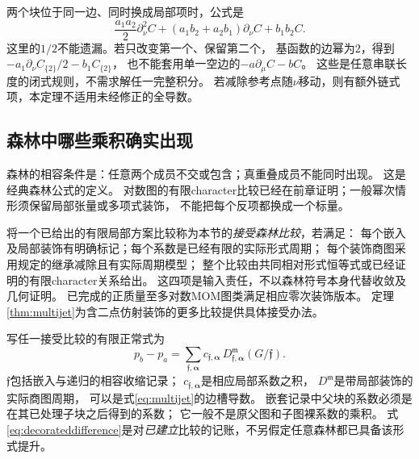 \documentclass[11pt,a4paper]{ctexart}
\theoremstyle{cnplain}\newtheorem{theorem}{定理}[section]
\theoremstyle{definition}\newtheorem{definition}[theorem]{定义}
\theoremstyle{remark}\newtheorem{remark}[theorem]{注}
\begin{document}
两个块位于同一边、同时换成局部项时，公式是
\begin{equation}\label{eq:twojets}
 \frac{a_1a_2}{2}\partial_\nu^2 C
 +(a_1b_2+a_2b_1)\partial_\nu C+b_1b_2 C.
\end{equation}
这里的$1/2$不能遗漏。若只改变第一个、保留第二个，
基函数的边幂为$2$，得到$-a_1\partial_\nu C_{\{2\}}/2-b_1C_{\{2\}}$，
也不能套用单一空边的$-a\partial_\mu C-bC$。
这些是任意串联长度的闭式规则，不需求解任一完整积分。
若减除参考点随$\nu$移动，则有额外链式项，本定理不适用未经修正的全导数。

\subsection{森林中哪些乘积确实出现}

森林的相容条件是：任意两个成员不交或包含；真重叠成员不能同时出现。
这是经典森林公式的定义\cite[\S2--3.2]{BK}。
对数图的有限character比较已经在前章证明；一般幂次情形须保留局部张量或多项式装饰，
不能把每个反项都换成一个标量。

将一个已给出的有限局部方案比较称为本节的\emph{接受森林比较}，若满足：
每个嵌入及局部装饰有明确标记；每个系数是已经有限的实际形式周期；
每个装饰商图采用规定的继承减除且有实际周期模型；
整个比较由共同相对形式恒等式或已经证明的有限character关系给出。
这四项是输入责任，不以森林符号本身代替收敛及几何证明。
已完成的正质量至多对数MOM图类满足相应零次装饰版本。
定理\ref{thm:multijet}为含二点仿射装饰的更多比较提供具体接受办法。

写任一接受比较的有限正常式为
\begin{equation}\label{eq:decorateddifference}
 p_b-p_a=
 \sum_{\mathfrak f,\boldsymbol\alpha}
 c_{\mathfrak f,\boldsymbol\alpha}\,
 D_{\mathfrak f,\boldsymbol\alpha}^{\mathfrak m}
 (G/\mathfrak f).
\end{equation}
$\mathfrak f$包括嵌入与递归的相容收缩记录；
$c_{\mathfrak f,\boldsymbol\alpha}$是相应局部系数之积，
$D^{\mathfrak m}$是带局部装饰的实际商图周期，
可以是式\eqref{eq:multijet}的边槽导数。
嵌套记录中父块的系数必须是在其已处理子块之后得到的系数；
它一般不是原父图和子图裸系数的乘积。
式\eqref{eq:decorateddifference}是对\emph{已建立}比较的记账，不另假定任意森林都已具备该形式提升。
\end{document}
